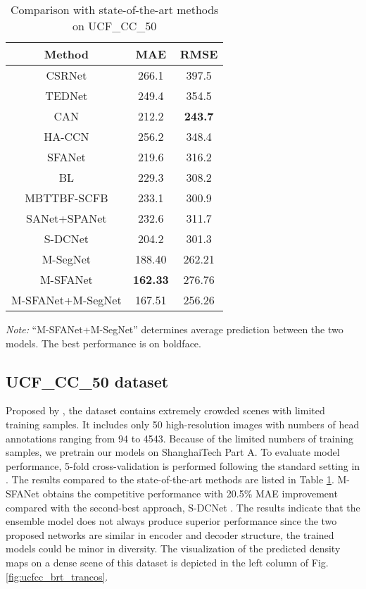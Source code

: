 \documentclass[10pt, conference, a4paper]{IEEEtran}
\begin{document}
\setlength{\tabcolsep}{1.4pt} \setlength{\tabcolsep}{4pt}
\begin{table}
\begin{center}
\caption{Comparison with state-of-the-art methods on UCF\_CC\_50 \cite{bansal2015people}}
\begin{tabular}{c|c|c}
\hline
Method & MAE & RMSE\\
\hline
CSRNet \cite{li2018csrnet} & 266.1 & 397.5\\
TEDNet \cite{jiang2019crowd} & 249.4 & 354.5\\
CAN \cite{liu2019context} & 212.2 & \textbf{243.7}\\
HA-CCN \cite{sindagi2019ha} & 256.2 & 348.4\\
SFANet \cite{zhu2019dual} & 219.6 & 316.2\\
BL \cite{ma2019bayesian} & 229.3 & 308.2\\
MBTTBF-SCFB \cite{sindagi2019multi} & 233.1 & 300.9\\
SANet+SPANet \cite{he2015spatial} & 232.6 & 311.7\\
S-DCNet \cite{xiong2019open} & 204.2 & 301.3\\
\hline
M-SegNet & 188.40 & 262.21\\
M-SFANet & \textbf{162.33} & 276.76\\
M-SFANet+M-SegNet & 167.51 & 256.26\\
\hline
\end{tabular}
\label{table:ucfres}
\end{center}
\footnotesize\emph{Note:} ``M-SFANet+M-SegNet'' determines average prediction between the two models. The best performance is on boldface.
\end{table}
\setlength{\tabcolsep}{1.4pt} 
\subsection{UCF\_CC\_50 dataset}
Proposed by \cite{bansal2015people}, the dataset contains extremely crowded scenes with limited training samples. It includes only 50 high-resolution images with numbers of head annotations ranging from 94 to 4543. Because of the limited numbers of training samples, we pretrain our models on ShanghaiTech Part A. To evaluate model performance, 5-fold cross-validation is performed following the standard setting in \cite{bansal2015people}. The results compared to the state-of-the-art methods are listed in Table \ref{table:ucfres}. M-SFANet obtains the competitive performance with 20.5\% MAE improvement compared with the second-best approach, S-DCNet \cite{xiong2019open}. The results indicate that the ensemble model does not always produce superior performance since the two proposed networks are similar in encoder and decoder structure, the trained models could be minor in diversity. The visualization of the predicted density maps on a dense scene of this dataset is depicted in the left column of Fig. \ref{fig:ucfcc_brt_trancos}.
\label{UCF_CC_50_discussion}
\end{document}
